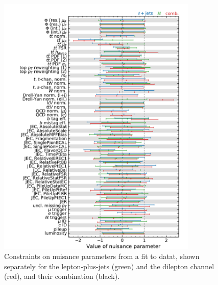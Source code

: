 \begin{figure}[!Hhtb]
\centering
\includegraphics[width=0.85\textwidth,keepaspectratio=true]{fig/app5/impacts/constraints_unblind.pdf}
\caption{Constraints on nuisance parameters from a fit to datat, shown separately for the lepton-plus-jets (green) and the dilepton channel (red), and their combination (black).}
\label{fig:impacts_constraints_obs}
\end{figure}

